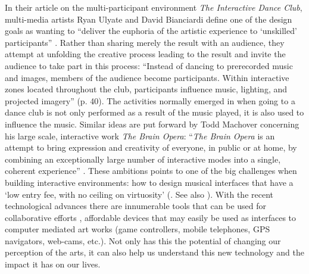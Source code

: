 In their article on the multi-participant environment \emph{The Interactive Dance Club}, multi-media artists Ryan Ulyate and David Bianciardi define one of the design goals as wanting to ``deliver the euphoria of the artistic experience to `unskilled' participants'' \citep[p.  41]{ulyate}. Rather than sharing merely the result with an audience, they attempt at unfolding the creative process leading to the result and invite the audience to take part in this process: ``Instead of dancing to prerecorded music and images, members of the audience become participants. Within interactive zones located throughout the club, participants influence music, lighting, and projected imagery'' (p. 40). The activities normally emerged in when going to a dance club is not only performed as a result of the music played, it is also used to influence the music. Similar ideas are put forward by Todd Machover concerning his large scale, interactive work \emph{The Brain Opera}: ``\emph{The Brain Opera} is an attempt to bring expression and creativity of everyone, in public or at home, by combining an exceptionally large number of interactive modes into a single, coherent experience'' \citep[Machover, 1996, as cited in][p. 360]{rowe01}. These ambitions points to one of the big challenges when building interactive environments: how to design musical interfaces that have a `low entry fee, with no ceiling on virtuosity' (\citealp{wessel, jorda02}.  See also \citealp{rowe, auracle}).  With the recent technological advances there are innumerable tools that can be used for collaborative efforts \citep{barbosa02}, affordable devices that may easily be used as interfaces to computer mediated art works (game controllers, mobile telephones, GPS navigators, web-cams, etc.). Not only has this the potential of changing our perception of the arts, it can also help us understand this new technology and the impact it has on our lives.

